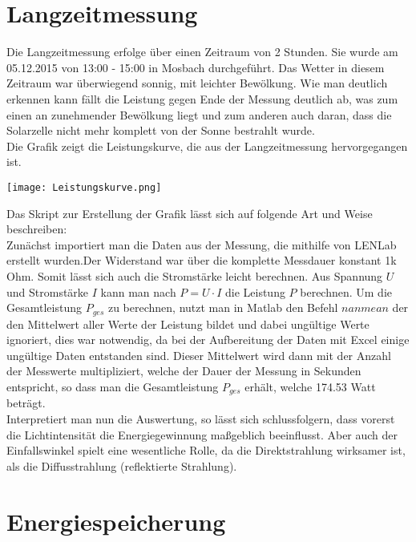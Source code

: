 \section{Langzeitmessung}
Die Langzeitmessung erfolge über einen Zeitraum von 2 Stunden. Sie wurde am 05.12.2015 von 13:00 - 15:00 in Mosbach durchgeführt. Das Wetter in diesem Zeitraum war überwiegend sonnig, mit leichter Bewölkung.
Wie man deutlich erkennen kann fällt die Leistung gegen Ende der Messung deutlich ab, was zum einen an zunehmender Bewölkung liegt und zum anderen auch daran, dass die Solarzelle nicht mehr komplett von der Sonne bestrahlt wurde.\\ 
Die Grafik zeigt die Leistungskurve, die aus der Langzeitmessung hervorgegangen ist.
\begin{center}
\texttt{[image: Leistungskurve.png]}
\end{center}
Das Skript zur Erstellung der Grafik lässt sich auf folgende Art und Weise beschreiben:\\
Zunächst importiert man die Daten aus der Messung, die mithilfe von LENLab erstellt wurden.Der Widerstand war über die komplette Messdauer konstant 1k Ohm. Somit lässt sich auch die Stromstärke leicht berechnen. Aus Spannung $U$ und Stromstärke $I$ kann man nach $P = U \cdot I$ die Leistung $P$ berechnen. Um die Gesamtleistung $P_{ges}$ zu berechnen, nutzt man in Matlab den Befehl $nanmean$ der den Mittelwert aller Werte der Leistung bildet und dabei ungültige Werte ignoriert, dies war notwendig, da bei der Aufbereitung der Daten mit Excel einige ungültige Daten entstanden sind. Dieser Mittelwert wird dann mit der Anzahl der Messwerte multipliziert, welche der Dauer der Messung in Sekunden entspricht, so dass man die Gesamtleistung $P_{ges}$ erhält, welche  174.53 Watt beträgt.\\

Interpretiert man nun die Auswertung, so lässt sich schlussfolgern, dass vorerst die Lichtintensität die Energiegewinnung maßgeblich beeinflusst. Aber auch der Einfallswinkel spielt eine wesentliche Rolle, da die Direktstrahlung wirksamer ist, als die Diffusstrahlung (reflektierte Strahlung). 

\section{Energiespeicherung}
